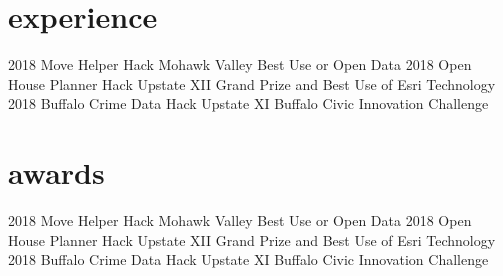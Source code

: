 \documentclass[]{twentysecondcv}
\begin{document}
\section{experience}

\begin{twenty}
  \twentyitem
    {2018}
    {Move Helper} %
    {Hack Mohawk Valley} %
    {Best Use or Open Data} %
  \twentyitem
    {2018}
    {Open House Planner} %
    {Hack Upstate XII} %
    {Grand Prize and Best Use of Esri Technology} %
  \twentyitem
    {2018}
    {Buffalo Crime Data} %
    {Hack Upstate XI} %
    {Buffalo Civic Innovation Challenge} %

\end{twenty}


\section{awards}

  \begin{twenty}
    \twentyitem
      {2018}
      {Move Helper} %
      {Hack Mohawk Valley} %
      {Best Use or Open Data} %
    \twentyitem
      {2018}
      {Open House Planner} %
      {Hack Upstate XII} %
      {Grand Prize and Best Use of Esri Technology} %
    \twentyitem
      {2018}
      {Buffalo Crime Data} %
      {Hack Upstate XI} %
      {Buffalo Civic Innovation Challenge} %

  \end{twenty}



\end{document}
